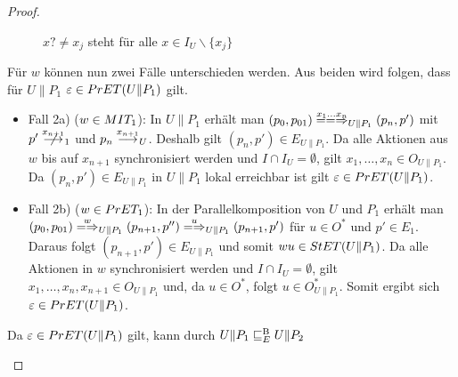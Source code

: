 \begin{proof}
\begin{itemize}
\begin{figure} [h!tbp]
\begin{center}
        \caption{$x?\neq x_j$ steht für alle $x\in I_U\backslash\{x_j\}$}
      \label{UohneE}
      \end{center}
      \end{figure}
      Für $w$ können nun zwei Fälle unterschieden werden. Aus beiden wird
      folgen, dass für $U\|P_1$ $\varepsilon\in PrET(U\|P_1)$ gilt.
      \begin{itemize}
        \item Fall 2a) ($w\in MIT _1$): In $U\|P_1$ erhält man $(p_0,p_{01})
          \lweakmay[x_1\dots x_n]_{U\|P_1} (p_n,p')$ mit $p'\nmust[x_{n+1}]_1$
          und $p_n\must[x_{n+1}]_U$. Deshalb gilt $(p_n,p')\in E_{U\|P_1}$. Da
          alle Aktionen aus $w$ bis auf $x_{n+1}$ synchronisiert werden und
          $I\cap I_U=\emptyset$, gilt $x_1,\dots , x_n\in O_{U\|P_1}$. Da
          $(p_n,p')\in E_{U\|P_1}$ in $U\|P_1$ lokal erreichbar ist gilt
          $\varepsilon\in PrET (U\|P_1)$.
        \item Fall 2b) ($w\in PrET _1$): In der Parallelkomposition von $U$ und
          $P_1$ erhält man $(p_0,p_{01}) \weakmay[w]_{U\|P_1} (p_{n+1},p'')
          \weakmay[u]_{U\|P_1} (p_{n+1},p')$ für $u\in O^*$ und $p'\in E_1$.
          Daraus folgt $(p_{n+1},p')\in E_{U\|P_1}$ und somit $wu\in StET
          (U\|P_1)$. Da alle Aktionen in $w$ synchronisiert werden und $I\cap
          I_U=\emptyset$, gilt $x_1,\dots ,x_n,x_{n+1}\in O_{U\|P_1}$ und, da
          $u\in O^*$, folgt $u\in O_{U\|P_1}^*$. Somit ergibt sich
          $\varepsilon\in PrET (U\|P_1)$.
      \end{itemize}
      Da $\varepsilon\in PrET (U\|P_1)$ gilt, kann durch $U\|P_1 \sqsubseteq  _E^\mathrm{B} U\|P_2$

\end{itemize}
\end{proof}
